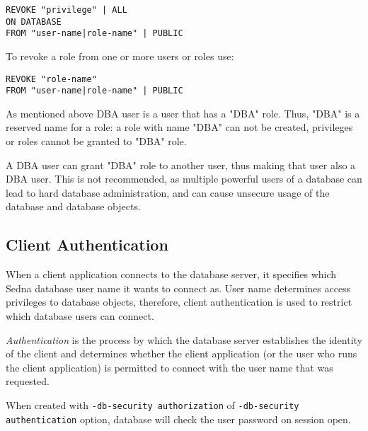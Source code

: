 \documentclass[a4paper,12pt]{article}
\begin{document}

\begin{verbatim}
REVOKE "privilege" | ALL
ON DATABASE
FROM "user-name|role-name" | PUBLIC
\end{verbatim}

To revoke a role from one or more users or roles use:


\begin{verbatim}
REVOKE "role-name"
FROM "user-name|role-name" | PUBLIC
\end{verbatim}

As mentioned above DBA user is a user that has a "DBA" role. Thus, "DBA" is a reserved name for a role: a role with name "DBA" can not be created, privileges or roles cannot be granted to "DBA" role.

A DBA user can grant "DBA" role to another user, thus making that user also a DBA user. This is not recommended, as multiple powerful users of a database can lead to hard database administration, and can cause unsecure usage of the database and database objects.


\subsection{Client Authentication}

When a client application connects to the database server, it specifies which Sedna database user name it wants to connect as. User name determines access privileges to database objects, therefore, client authentication is used to restrict which database users can connect.

\emph{Authentication} is the process by which the database server establishes the identity of the client and determines whether the client application (or the user who runs the client application) is permitted to connect with the user name that was requested.

When created with \verb!-db-security authorization! of \verb!-db-security authentication! option, database will check the user password on session open.
\end{document}
